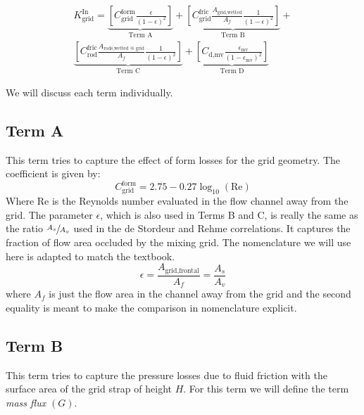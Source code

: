 \begin{fullwidth}
\begin{multline}
K_{\text{grid}}^{\text{In}} = \underbrace{\left[C_{\text{grid}}^{\text{form}}\frac{\epsilon}{\left(1-\epsilon \right)^2} \right]}_{\text{Term A}} + \underbrace{\left[C_{\text{grid}}^{\text{fric}} \frac{A_{\text{grid,wetted}}}{A_f} \frac{1}{\left(1 - \epsilon \right)^2}\right]}_{\text{Term B}} + \\ \underbrace{\left[C_{\text{rod}}^{\text{fric}} \frac{A_{\text{rods,wetted @ grid}}}{A_f} \frac{1}{\left(1 - \epsilon \right)^2}\right]}_{\text{Term C}}+\underbrace{\left[C_{\text{d,mv}} \frac{\epsilon_{\text{mv}}}{\left(1 - \epsilon_{\text{mv}} \right)^2} \right]}_{\text{Term D}}
\label{eq:k-In}
\end{multline}
\end{fullwidth}
We will discuss each term individually.

\subsection{Term A}
This term tries to capture the effect of form losses for the grid geometry. The coefficient is given by:
$$C_{\text{grid}}^{\text{form}} = 2.75 - 0.27 \log_{10}{(\text{Re})}$$
Where $\text{Re}$ is the Reynolds number evaluated in the flow channel away from the grid.  The parameter $\epsilon$, which is also used in Terms B and C, is really the same as the ratio $\sfrac{A_s}{A_v}$ used in the de Stordeur and Rehme correlations.  It captures the fraction of flow area occluded by the mixing grid.  The nomenclature we will use here is adapted to match the textbook.
$$\epsilon = \frac{A_{\text{grid,frontal}}}{A_f} = \frac{A_s}{A_v}$$
where $A_f$ is just the flow area in the channel away from the grid and the second equality is meant to make the comparison in nomenclature explicit.  

\subsection{Term B} 
This term tries to capture the pressure losses due to fluid friction with the surface area of the grid strap of height $H$.  For this term we will define the term \emph{mass flux} $(G)$. 

